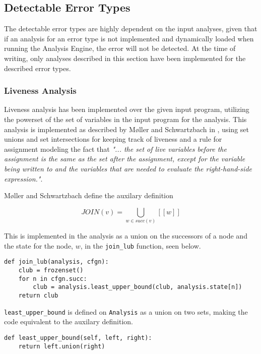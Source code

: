 \subsection{Detectable Error Types}

The detectable error types are highly dependent on the input analyses, given that if an analysis for an error type is not implemented and dynamically loaded when running the Analysis Engine, the error will not be detected. At the time of writing, only analyses described in this section have been implemented for the described error types. 

\subsubsection{Liveness Analysis}
Liveness analysis has been implemented over the given input program, utilizing the powerset of the set of variables in the input program for the analysis. 
This analysis is implemented as described by Møller and Schwartzbach in \cite{spa}, using set unions and set intersections for keeping track of liveness and a rule for assignment modeling the fact that \textit{"... the set of live variables before the assignment is the same as the set after the assignment, except for the variable being written to and the variables that are needed to evaluate the right-hand-side expression."}. 

\newpar Møller and Schwartzbach define the auxilary definition

\begin{equation*}
    J O I N (v) = \mathop{{\bigcup}}_{w \in succ(v)} [[w]]
\end{equation*}

\noindent This is implemented in the analysis as a union on the successors of a node and the state for the node, $w$, in the \texttt{join\_lub} function, seen below. 

\begin{verbatim}
def join_lub(analysis, cfgn):
    club = frozenset()
    for n in cfgn.succ:
        club = analysis.least_upper_bound(club, analysis.state[n])
    return club
\end{verbatim}

\noindent \texttt{least\_upper\_bound} is defined on \texttt{Analysis} as a union on two sets, making the code equivalent to the auxilary definition. 

\begin{verbatim}
def least_upper_bound(self, left, right):
    return left.union(right)
\end{verbatim}


